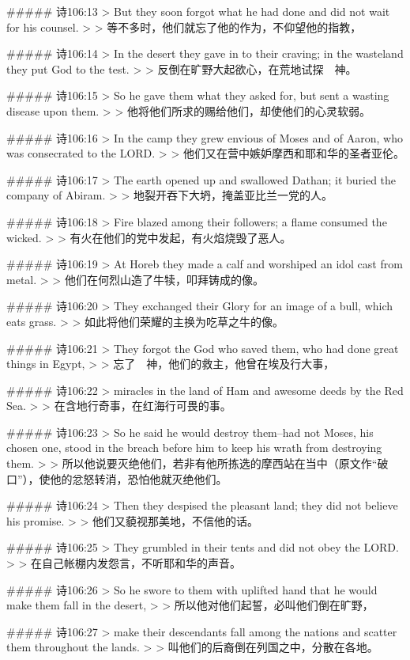 ##### 诗106:13
> But they soon forgot what he had done and did not wait for his counsel.
>
> 等不多时，他们就忘了他的作为，不仰望他的指教，


##### 诗106:14
> In the desert they gave in to their craving; in the wasteland they put God to the test.
>
> 反倒在旷野大起欲心，在荒地试探　神。


##### 诗106:15
> So he gave them what they asked for, but sent a wasting disease upon them.
>
> 他将他们所求的赐给他们，却使他们的心灵软弱。


##### 诗106:16
> In the camp they grew envious of Moses and of Aaron, who was consecrated to the LORD.
>
> 他们又在营中嫉妒摩西和耶和华的圣者亚伦。


##### 诗106:17
> The earth opened up and swallowed Dathan; it buried the company of Abiram.
>
> 地裂开吞下大坍，掩盖亚比兰一党的人。


##### 诗106:18
> Fire blazed among their followers; a flame consumed the wicked.
>
> 有火在他们的党中发起，有火焰烧毁了恶人。


##### 诗106:19
> At Horeb they made a calf and worshiped an idol cast from metal.
>
> 他们在何烈山造了牛犊，叩拜铸成的像。


##### 诗106:20
> They exchanged their Glory for an image of a bull, which eats grass.
>
> 如此将他们荣耀的主换为吃草之牛的像。


##### 诗106:21
> They forgot the God who saved them, who had done great things in Egypt,
>
> 忘了　神，他们的救主，他曾在埃及行大事，


##### 诗106:22
> miracles in the land of Ham and awesome deeds by the Red Sea.
>
> 在含地行奇事，在红海行可畏的事。


##### 诗106:23
> So he said he would destroy them--had not Moses, his chosen one, stood in the breach before him to keep his wrath from destroying them.
>
> 所以他说要灭绝他们，若非有他所拣选的摩西站在当中（原文作“破口”），使他的忿怒转消，恐怕他就灭绝他们。


##### 诗106:24
> Then they despised the pleasant land; they did not believe his promise.
>
> 他们又藐视那美地，不信他的话。


##### 诗106:25
> They grumbled in their tents and did not obey the LORD.
>
> 在自己帐棚内发怨言，不听耶和华的声音。


##### 诗106:26
> So he swore to them with uplifted hand that he would make them fall in the desert,
>
> 所以他对他们起誓，必叫他们倒在旷野，


##### 诗106:27
> make their descendants fall among the nations and scatter them throughout the lands.
>
> 叫他们的后裔倒在列国之中，分散在各地。


